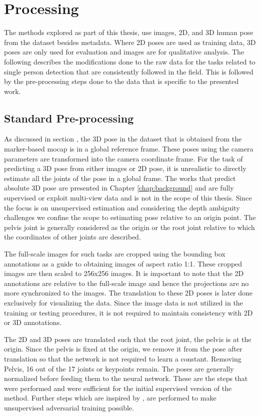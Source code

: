 \section{Processing}
\label{sec:processing}
The methods explored as part of this thesis, use images, 2D, and 3D human pose from the dataset besides metadata. Where 2D poses are used as training data, 3D poses are only used for evaluation and images are for qualitative analysis. The following describes the modifications done to the raw data for the tasks related to single person detection that are consistently followed in the field. This is followed by the pre-processing steps done to the data that is specific to the presented work.

\subsection{Standard Pre-processing}
As discussed in section , the 3D pose in the dataset that is obtained from the marker-based \ac{mocap} is in a global reference frame. These poses using the camera parameters are transformed into the camera coordinate frame. For the task of predicting a 3D pose from either images or 2D pose, it is unrealistic to directly estimate all the joints of the pose in a global frame. The works that predict absolute 3D pose are presented in Chapter \ref{chap:background} and are fully supervised or exploit multi-view data and is not in the scope of this thesis. Since the focus is on unsupervised estimation and considering the depth ambiguity challenges we confine the scope to estimating pose relative to an origin point. The pelvis joint is generally considered as the origin or the root joint relative to which the coordinates of other joints are described. 

The full-scale images for such tasks are cropped using the bounding box annotations as a guide to obtaining images of aspect ratio 1:1. These cropped images are then scaled to 256x256 images. It is important to note that the 2D annotations are relative to the full-scale image and hence the projections are no more synchronized to the images. The translation to these 2D poses is later done exclusively for visualizing the data. Since the image data is not utilized in the training or testing procedures, it is not required to maintain consistency with 2D or 3D annotations. 

The 2D and 3D poses are translated such that the root joint, the pelvis is at the origin. Since the pelvis is fixed at the origin, we remove it from the pose after translation so that the network is not required to learn a constant. Removing Pelvis, 16 out of the 17 joints or keypoints remain. The poses are generally normalized before feeding them to the neural network. These are the steps that were performed and were sufficient for the initial supervised version of the method. Further steps which are inspired by \cite{amazon1}, are performed to make unsupervised adversarial training possible. 

